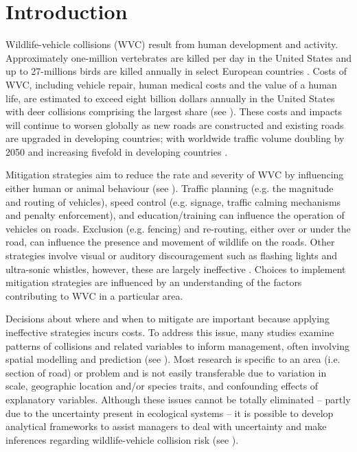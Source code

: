 \newpage
\section{Introduction}

Wildlife-vehicle collisions (WVC) result from human development and activity. Approximately one-million vertebrates are killed per day in the United States \citep{form98} and up to 27-millions birds are killed annually in select European countries \citep{erri03}.  Costs of WVC, including vehicle repair, human medical costs and the value of a human life, are estimated to exceed eight billion dollars annually in the United States \citep{huij07b} with deer collisions comprising the largest share (see \cite{biss08b}).  These costs and impacts will continue to worsen globally as new roads are constructed and existing roads are upgraded in developing countries; with worldwide traffic volume doubling by 2050 and increasing fivefold in developing countries \citep{rvdr15}.

Mitigation strategies aim to reduce the rate and severity of WVC by influencing either human or animal behaviour (see \cite{huij10}).  Traffic planning (e.g. the magnitude and routing of vehicles), speed control (e.g. signage, traffic calming mechanisms and penalty enforcement), and education/training can influence the operation of vehicles on roads.  Exclusion (e.g. fencing) and re-routing, either over or under the road, can influence the presence and movement of wildlife on the roads.  Other strategies involve visual or auditory discouragement such as flashing lights and ultra-sonic whistles, however, these are largely ineffective \citep{reev93,bend03,sche03,ramp06c}. Choices to implement mitigation strategies are influenced by an understanding of the factors contributing to WVC in a particular area.

Decisions about where and when to mitigate are important because applying ineffective strategies incurs costs.  To address this issue, many studies examine patterns of collisions and related variables to inform management, often involving spatial modelling and prediction (see \cite{guns11}).  Most research is specific to an area (i.e. section of road) or problem and is not easily transferable due to variation in scale, geographic location and/or species traits, and confounding effects of explanatory variables.  Although these issues cannot be totally eliminated -- partly due to the uncertainty present in ecological systems -- it is possible to develop analytical frameworks to assist managers to deal with uncertainty and make inferences regarding wildlife-vehicle collision risk (see ).

